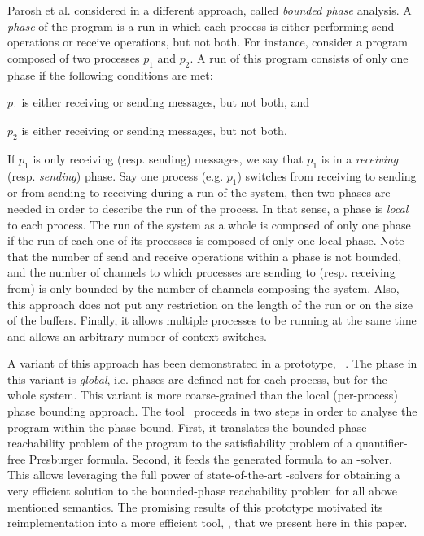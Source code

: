 Parosh et al. considered in \cite{AAC13} a different approach, called \textit{bounded phase} analysis.
%
A \textit{phase} of the program is a run in which each process 
is either performing send operations or receive operations, but not both.
%
For instance, consider a program composed of two processes $p_1$ and $p_2$.
A run of this program consists of only one phase if the following conditions are met:
\begin{inparaenum}[i)]
\item $p_1$ is either receiving or sending messages, but not both, and
\item $p_2$ is either receiving or sending messages, but not both.
\end{inparaenum}
%
If $p_1$ is only receiving (resp. sending) messages, we say that $p_1$ is in a \textit{receiving} (resp. \textit{sending}) phase.
%
Say one process (e.g. $p_1$) switches from receiving to sending or from sending to receiving during a run of the system, then two phases are needed in order to describe the run of the process.
%
In that sense, a phase is \textit{local} to each process.
%
The run of the system as a whole is composed of only one phase
if the run of each one of its processes is composed of only one local phase.
%
Note that the number of send and receive operations within a phase is not bounded,
and the number of channels to which processes are sending to (resp. receiving from)
is only bounded by the number of channels composing the system.
%
Also, this approach does not put any restriction on the length of the
run or on the size of the buffers.
%
Finally, it allows multiple processes to be running at the same time and allows an arbitrary number of context switches.

A variant of this approach has been demonstrated in a prototype, \alternator\ \cite{github.alternator}.
%
The phase in this variant is \textit{global}, i.e. phases are defined not for each process, but for the whole system.
%
%
This variant is more coarse-grained than the local (per-process) phase bounding approach.
%
The tool \alternator\ proceeds in two steps in order to analyse the program within the phase bound.
%
First, it translates the bounded phase reachability problem of the program to
the satisfiability problem of a quantifier-free Presburger formula.
%
Second, it feeds the generated formula to an \Smt-solver.
%
This allows leveraging the full power of state-of-the-art \Smt-solvers for obtaining a very efficient solution to the bounded-phase reachability problem for all above mentioned semantics. 
%
%
The promising results of this prototype motivated its reimplementation into a more efficient tool, \MPass, that we present here in this paper.

